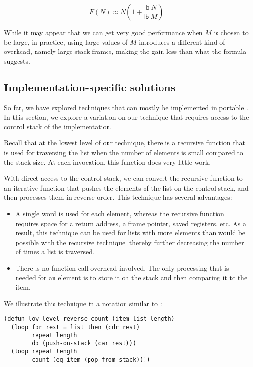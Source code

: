 \[ F(N) \approx N(1 + \frac{\mathsf{lb}~N}{\mathsf{lb}~M}) \]

While it may appear that we can get very good performance when $M$ is
chosen to be large, in practice, using large values of $M$ introduces
a different kind of overhead, namely large stack frames, making the
gain less than what the formula suggests.

\subsection{Implementation-specific solutions}

So far, we have explored techniques that can mostly be implemented in
portable \commonlisp{}.  In this section, we explore a variation on
our technique that requires access to the control stack of the
implementation.

Recall that at the lowest level of our technique, there is a recursive
function that is used for traversing the list when the number of
elements is small compared to the stack size.  At each invocation,
this function does very little work.

With direct access to the control stack, we can convert the recursive
function to an iterative function that pushes the elements of the list
on the control stack, and then processes them in reverse order.  This
technique has several advantages:

\begin{itemize}
\item A single word is used for each element, whereas the recursive
  function requires space for a return address, a frame pointer,
  saved registers, etc.  As a result, this technique can be used for
  lists with more elements than would be possible with the recursive
  technique, thereby further decreasing the number of times a list is
  traversed.
\item There is no function-call overhead involved.  The only
  processing that is needed for an element is to store it on the stack
  and then comparing it to the item.
\end{itemize}

We illustrate this technique in a notation similar to \commonlisp{}:

{\small
\begin{verbatim}
(defun low-level-reverse-count (item list length)
  (loop for rest = list then (cdr rest)
        repeat length
        do (push-on-stack (car rest)))
  (loop repeat length
        count (eq item (pop-from-stack))))
\end{verbatim}
}

